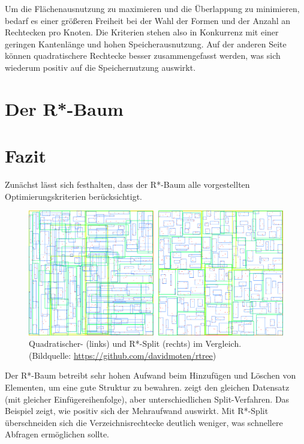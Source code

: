 \documentclass[runningheads,a4paper]{llncs}
\begin{document}
	Um die Flächenausnutzung zu maximieren und die Überlappung zu minimieren, bedarf es einer größeren Freiheit bei der Wahl der Formen und der Anzahl an Rechtecken pro Knoten. Die Kriterien stehen also in Konkurrenz mit einer geringen Kantenlänge und hohen Speicherausnutzung. Auf der anderen Seite können quadratischere Rechtecke besser zusammengefasst werden, was sich wiederum positiv auf die Speichernutzung auswirkt. \citep[vgl.][323-324]{Beckmann:1990}
	


\section{Der R*-Baum} %
\label{sec:rstar_tree}




\section{Fazit} %
\label{sec:fazit}

	Zunächst lässt sich festhalten, dass der R*-Baum alle vorgestellten Optimierungskriterien berücksichtigt.

	\begin{figure}[H]
		\centering
		\includegraphics[width=1\textwidth]{vergleich-quad-star.png}
		\caption{Quadratischer- (links) und R*-Split (rechts) im Vergleich. (Bildquelle: \url{https://github.com/davidmoten/rtree})}
		\label{fig:vergleich-quad-star}
	\end{figure}

	Der R*-Baum betreibt sehr hohen Aufwand beim Hinzufügen und Löschen von Elementen, um eine gute Struktur zu bewahren.  zeigt den gleichen Datensatz (mit gleicher Einfügereihenfolge), aber unterschiedlichen Split-Verfahren. Das Beispiel zeigt, wie positiv sich der Mehraufwand auswirkt. Mit R*-Split überschneiden sich die Verzeichnisrechtecke deutlich weniger, was schnellere Abfragen ermöglichen sollte.
\end{document}
